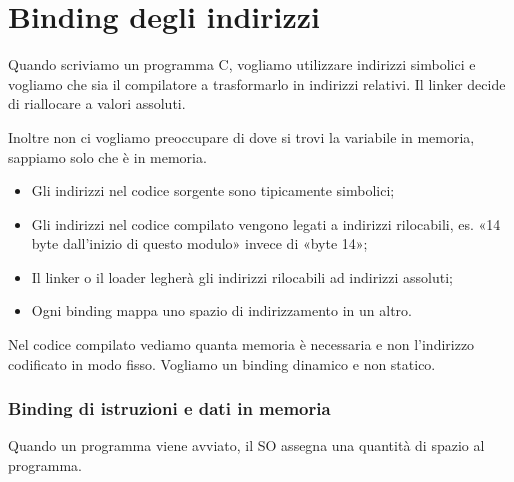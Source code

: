 \section{Binding degli indirizzi}

Quando scriviamo un programma C, vogliamo utilizzare indirizzi simbolici e vogliamo che sia il compilatore a trasformarlo in indirizzi relativi.
Il linker decide di riallocare a valori assoluti.

Inoltre non ci vogliamo preoccupare di dove si trovi la variabile in memoria, sappiamo solo che è in memoria.

\begin{itemize}
  \item Gli indirizzi nel codice sorgente sono tipicamente simbolici;
  \item Gli indirizzi nel codice compilato vengono legati a indirizzi rilocabili, es. «14 byte dall'inizio di questo modulo» invece di «byte 14»;
  \item Il linker o il loader legherà gli indirizzi rilocabili ad indirizzi assoluti;
  \item Ogni binding mappa uno spazio di indirizzamento in un altro.
\end{itemize}

Nel codice compilato vediamo quanta memoria è necessaria e non l'indirizzo codificato in modo fisso. Vogliamo un binding dinamico e non statico.


\subsubsection{Binding di istruzioni e dati in memoria}


Quando un programma viene avviato, il SO assegna una quantità di spazio al programma.

